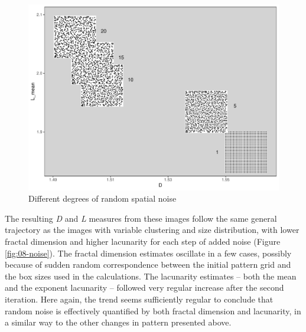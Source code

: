 \documentclass[
  12pt,
]{book}
\begin{document}
\begin{figure}
\hypertarget{fig:08-noise-im}{%
\centering
\includegraphics{Results/fig08_noise_im.pdf}
\caption{Different degrees of random spatial noise}\label{fig:08-noise-im}
}
\end{figure}

The resulting \emph{D} and \emph{L} measures from these images follow the same general trajectory as the images with variable clustering and size distribution, with lower fractal dimension and higher lacunarity for each step of added noise (Figure \ref{fig:08-noise}). The fractal dimension estimates oscillate in a few cases, possibly because of sudden random correspondence between the initial pattern grid and the box sizes used in the calculations. The lacunarity estimates -- both the mean and the exponent lacunarity -- followed very regular increase after the second iteration. Here again, the trend seems sufficiently regular to conclude that random noise is effectively quantified by both fractal dimension and lacunarity, in a similar way to the other changes in pattern presented above.
\end{document}
